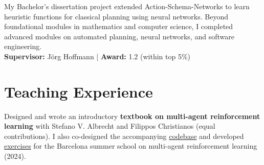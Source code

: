 \documentclass[a4paper,12pt]{article}
\begin{document}
\begin{expblock}
    My Bachelor's dissertation project extended Action-Schema-Networks to learn heuristic functions for classical planning using neural networks. Beyond foundational modules in mathematics and computer science, I completed advanced modules on automated planning, neural networks, and software engineering.\\
    \textbf{Supervisor:} J\"org Hoffmann \hspace{1em} | \hspace{1em}
    \textbf{Award:} 1.2 (within top 5\%)
\end{expblock}

\section{Teaching Experience}

\begin{expblock}
    Designed and wrote an introductory \textbf{textbook on multi-agent reinforcement learning} with Stefano V. Albrecht and Filippos Christianos (equal contributions). I also co-designed the accompanying \href{https://github.com/marl-book/codebase}{codebase} and developed \href{https://github.com/marl-book/marl-book-exercises}{exercises} for the Barcelona summer school on multi-agent reinforcement learning (2024). %
\end{expblock}
\end{document}
